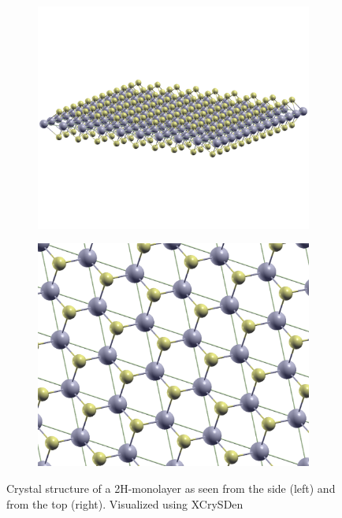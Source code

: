 \documentclass[main.tex]{subfiles}
\begin{document}
\begin{figure}
    \begin{subfigure}{0.49\textwidth}
        \centering
        \includegraphics[width=\textwidth]{structure_images/TaS2_from_the_side.png}
    \end{subfigure}
    \begin{subfigure}{0.49\textwidth}
        \centering
        \includegraphics[width=\textwidth]{structure_images/TaS2_from_above.png}
    \end{subfigure}
    \caption{Crystal structure of a 2H-\TaS monolayer as seen from the side (left) and from the top (right). Visualized using XCrySDen \cite{kokalj_xcrysdennew_1999}}
    \label{fig:tas2_structure}
\end{figure}
\end{document}
